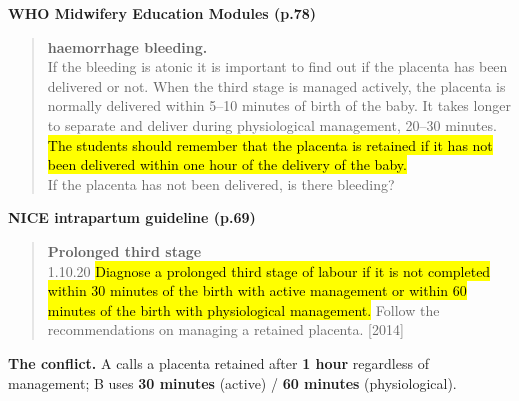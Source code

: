 \smallskip
\noindent\textbf{WHO Midwifery Education Modules (p.78)}
\begin{quote}\footnotesize
\textbf{haemorrhage bleeding.}\\
If the bleeding is atonic it is important to find out if the placenta has been delivered or not. When the third stage is managed actively, the placenta is normally delivered within 5–10 minutes of birth of the baby. It takes longer to separate and deliver during physiological management, 20–30 minutes.\\
\hl{The students should remember that the placenta is retained if it has not been delivered within one hour of the delivery of the baby.}\\
If the placenta has not been delivered, is there bleeding?
\end{quote}
\noindent\textbf{NICE intrapartum guideline (p.69)}
\begin{quote}\footnotesize
\textbf{Prolonged third stage}\\
1.10.20 \hl{Diagnose a prolonged third stage of labour if it is not completed within 30 minutes of the birth with active management or within 60 minutes of the birth with physiological management.} Follow the recommendations on managing a retained placenta. [2014]
\end{quote}
\noindent\textbf{The conflict.} A calls a placenta retained after \textbf{1 hour} regardless of management; B uses \textbf{30 minutes} (active) / \textbf{60 minutes} (physiological).
